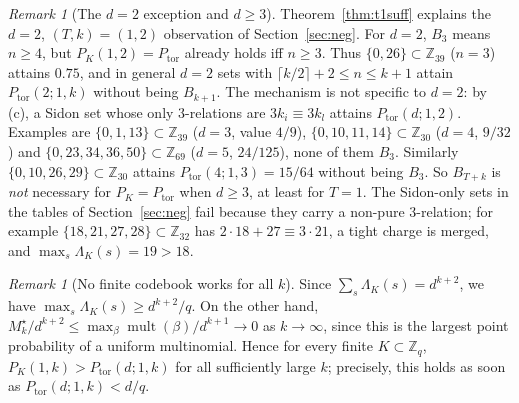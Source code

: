 \documentclass[11pt]{article}
\newcommand{\Z}{\mathbb{Z}}
\newcommand{\mult}{\operatorname{mult}}
\newcommand{\Ptor}{P_{\mathrm{tor}}}
\theoremstyle{definition}
\theoremstyle{remark}
\newtheorem{remark}[theorem]{Remark}
\begin{document}
\begin{remark}[The $d=2$ exception and $d\ge3$]
Theorem~\ref{thm:t1suff} explains the $d=2$, $(T,k)=(1,2)$ observation of Section~\ref{sec:neg}. For $d=2$, $B_3$ means $n\ge4$, but
$P_K(1,2)=\Ptor$ already holds iff $n\ge3$. Thus $\{0,26\}\subset\Z_{39}$ ($n=3$) attains $0.75$, and in general $d=2$ sets with
$\lceil k/2\rceil+2\le n\le k+1$ attain $\Ptor(2;1,k)$ without being $B_{k+1}$. The mechanism is not specific to $d=2$: by (c), a Sidon
set whose only $3$-relations are $3k_i\equiv3k_l$ attains $\Ptor(d;1,2)$. Examples are $\{0,1,13\}\subset\Z_{39}$ ($d=3$, value $4/9$),
$\{0,10,11,14\}\subset\Z_{30}$ ($d=4$, $9/32$) and $\{0,23,34,36,50\}\subset\Z_{69}$ ($d=5$, $24/125$), none of them $B_3$. Similarly
$\{0,10,26,29\}\subset\Z_{30}$ attains $\Ptor(4;1,3)=15/64$ without being $B_3$. So $B_{T+k}$ is \emph{not} necessary for
$P_K=\Ptor$ when $d\ge3$, at least for $T=1$. The Sidon-only sets in the tables of Section~\ref{sec:neg} fail because they carry a non-pure $3$-relation; for
example $\{18,21,27,28\}\subset\Z_{32}$ has $2\cdot18+27\equiv3\cdot21$, a tight charge is merged, and $\max_s\Lambda_K(s)=19>18$.
\end{remark}

\begin{remark}[No finite codebook works for all $k$]
Since $\sum_s\Lambda_K(s)=d^{k+2}$, we have $\max_s\Lambda_K(s)\ge d^{k+2}/q$. On the other hand,
$M^\star_k/d^{k+2}\le\max_\beta\mult(\beta)/d^{k+1}\to0$ as $k\to\infty$, since this is the largest point probability of a uniform
multinomial. Hence for every finite $K\subset\Z_q$, $P_K(1,k)>\Ptor(d;1,k)$ for all sufficiently large $k$; precisely, this holds as soon as
$\Ptor(d;1,k)<d/q$.
\end{remark}
\end{document}
